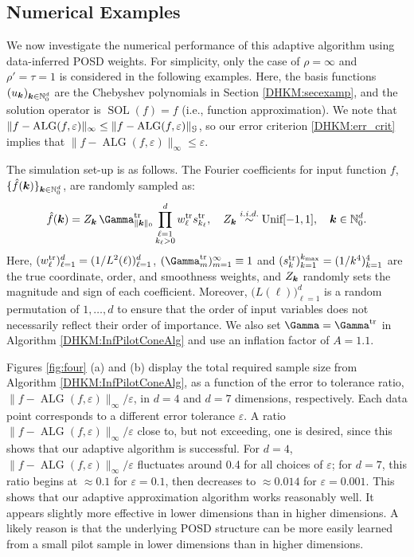 \documentclass[USenglish]{article}
\theoremstyle{dgthm}
\theoremstyle{dgthm}
\theoremstyle{dgthm}
\theoremstyle{dgthm}
\theoremstyle{dgdef}
\theoremstyle{definition}
\DeclareMathOperator{\DHKMSOL}{SOL}
\DeclareMathOperator{\DHKMALG}{ALG}
\begin{document}
\subsection{Numerical Examples} \label{DHKM:numexamp_sec}

We now investigate the numerical performance of this adaptive algorithm using data-inferred POSD weights. For simplicity, only the case of $\rho = \infty$ and $\rho' = \tau = 1$ is considered in the following examples. Here, the basis functions $(u_{\boldsymbol{k}})_{{\boldsymbol{k}} \in \mathbb{N}_0^d}$ are the Chebyshev polynomials in Section \ref{DHKM:secexamp}, and the solution operator is $\DHKMSOL (f) = f$ (i.e., function approximation). We note that $\|f - \DHKMALG(f,\varepsilon)\|_\infty \le \|f - \DHKMALG(f,\varepsilon)\|_\calG$, so our error criterion \eqref{DHKM:err_crit} implies that $\|f - \DHKMALG(f,\varepsilon)\|_\infty \le \varepsilon$.

The simulation set-up is as follows. The Fourier coefficients for input function $f$, $\{\hat{f}({\boldsymbol{k}})\}_{{\boldsymbol{k}} \in \mathbb{N}_0^d}$, are randomly sampled as:
\begin{equation*}
\hat{f}(\bsk) = Z_{\bsk} \,  {\Gamma}_{\|\bsk\|_0}^{\rm tr} \prod_{\substack{\ell=1\\ k_\ell>0}}^d {w_\ell^{\rm tr}} {s}_{k_\ell}^{\rm tr}, \quad Z_{\bsk} \overset{i.i.d.}{\sim} \text{Unif}[-1, 1], \quad \bsk \in \mathbb{N}_0^d.
\end{equation*}
Here, $(w_\ell^{\rm tr})_{\ell=1}^d = (1/L^2(\ell))_{\ell=1}^d$, $({\Gamma_m^{\rm tr}})_{m=1}^\infty \equiv 1$ and $(s_k^{\rm tr})_{k=1}^{k_{\rm max}} = (1/k^4)_{k=1}^4$ are the true coordinate, order, and smoothness weights, and $Z_{{\boldsymbol{k}}}$ randomly sets the magnitude and sign of each coefficient. Moreover, $\bigl(L(\ell)\bigr)_{\ell=1}^d$ is a random permutation of $1, \ldots, d$ to ensure that the order of input variables does not necessarily reflect their order of importance. We also set $\boldsymbol{\Gamma} = \boldsymbol{\Gamma}^{\rm tr}$ in Algorithm \ref{DHKM:InfPilotConeAlg} and use an inflation factor of $A = 1.1$.

Figures \ref{fig:four} (a) and (b) display the total required sample size from Algorithm \ref{DHKM:InfPilotConeAlg}, as a function of the error to tolerance ratio, $\|f - \DHKMALG(f,\varepsilon)\|_\infty/\varepsilon$, in $d=4$ and $d=7$ dimensions, respectively. Each data point corresponds to a different error tolerance $\varepsilon$. A ratio $\|f - \DHKMALG(f,\varepsilon)\|_\infty/\varepsilon$ close to, but not exceeding, one is desired, since this shows that our adaptive algorithm is successful. For $d=4$, $\|f - \DHKMALG(f,\varepsilon)\|_\infty/\varepsilon$ fluctuates around 0.4 for all choices of $\varepsilon$; for $d=7$, this ratio begins at $\approx 0.1$ for $\varepsilon = 0.1$, then decreases to $\approx 0.014$ for $\varepsilon = 0.001$. This shows that our adaptive approximation algorithm works reasonably well.  It appears slightly more effective in lower dimensions  than in higher dimensions. A likely reason is that the underlying POSD structure can be more easily learned from a small pilot sample in lower dimensions than in higher dimensions.
\end{document}
